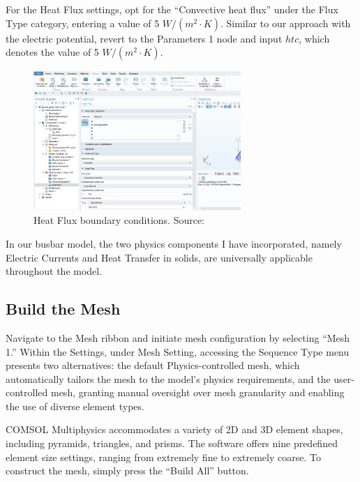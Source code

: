 For the Heat Flux settings, opt for the ``Convective heat flux'' under the Flux Type category, entering a value of 5 $W/(m^2\cdot K)$. Similar to our approach with the electric potential, revert to the Parameters 1 node and input $htc$, which denotes the value of 5 $W/(m^2\cdot K)$.

\begin{figure}[H]
  \centering
  \includegraphics[width=0.7\textwidth]{Chapters/Figures/Chapter 3 Figures/Heat Flux Boundary Conditions.png}
  \caption{Heat Flux boundary conditions. Source: \cite{multiphysics__modeling_nodate}}
  \label{fig:Heat Flux boundary conditions.}
\end{figure}

In our busbar model, the two physics components I have incorporated, namely Electric Currents and Heat Transfer in solids, are universally applicable throughout the model.

\subsection{Build the Mesh}
Navigate to the Mesh ribbon and initiate mesh configuration by selecting ``Mesh 1.'' Within the Settings, under Mesh Setting, accessing the Sequence Type menu presents two alternatives: the default Physics-controlled mesh, which automatically tailors the mesh to the model's physics requirements, and the user-controlled mesh, granting manual oversight over mesh granularity and enabling the use of diverse element types.

COMSOL Multiphysics accommodates a variety of 2D and 3D element shapes, including pyramids, triangles, and prisms. The software offers nine predefined element size settings, ranging from extremely fine to extremely coarse. To construct the mesh, simply press the ``Build All'' button.

